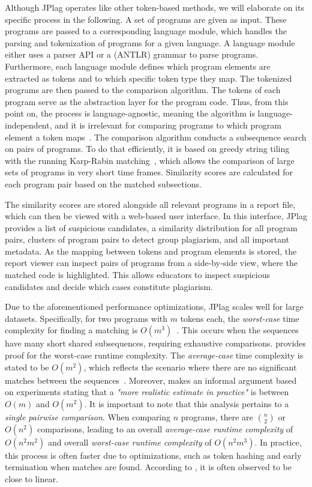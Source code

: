 Although JPlag operates like other token-based methods, we will elaborate on its specific process in the following.
A set of programs are given as input. These programs are passed to a corresponding language module, which handles the parsing and tokenization of programs for a given language. A language module either uses a parser API or a (ANTLR) grammar to parse programs. Furthermore, each language module defines which program elements are extracted as tokens and to which specific token type they map.
The tokenized programs are then passed to the comparison algorithm. The tokens of each program serve as the abstraction layer for the program code. Thus, from this point on, the process is language-agnostic, meaning the algorithm is language-independent, and it is irrelevant for comparing programs to which program element a token maps~\cite{prechelt2002}.
The comparison algorithm conducts a subsequence search on pairs of programs. To do that efficiently, it is based on greedy string tiling with the running Karp-Rabin matching~\cite{Wise1993, Wise1995}, which allows the comparison of large sets of programs in very short time frames.
Similarity scores are calculated for each program pair based on the matched subsections.

The similarity scores are stored alongside all relevant programs in a report file, which can then be viewed with a web-based user interface.
In this interface, JPlag provides a list of suspicious candidates, a similarity distribution for all program pairs, clusters of program pairs to detect group plagiarism, and all important metadata.
As the mapping between tokens and program elements is stored, the report viewer can inspect pairs of programs from a side-by-side view, where the matched code is highlighted. This allows educators to inspect suspicious candidates and decide which cases constitute plagiarism.

Due to the aforementioned performance optimizations, JPlag scales well for large datasets.
Specifically, for two programs with \( m \) tokens each, the \textit{worst-case} time complexity for finding a matching is \( O(m^3) \)~\cite{Wise1993, prechelt2000}.
This occurs when the sequences have many short shared subsequences, requiring exhaustive comparisons.
\citet{Wise1993} provides proof for the worst-case runtime complexity.
The \textit{average-case} time complexity is stated to be \( O(m^2) \), which reflects the scenario where there are no significant matches between the sequences~\cite{prechelt2002}. 
Moreover, \citet{Wise1993} makes an informal argument based on experiments stating that a \textit{"more realistic estimate in practice"} is between \(O(m)\) and \(O(m^2)\).
%
It is important to note that this analysis pertains to a \textit{single pairwise comparison}. When comparing \( n \) programs, there are \( \binom{n}{2} \) or \( O(n^2) \) comparisons, leading to an overall \textit{average-case runtime complexity} of \( O(n^2 m^2) \) and overall \textit{worst-case runtime complexity} of \( O(n^2 m^3) \). In practice, this process is often faster due to optimizations, such as token hashing and early termination when matches are found. According to \cite{Wise1993}, it is often observed to be close to linear.

